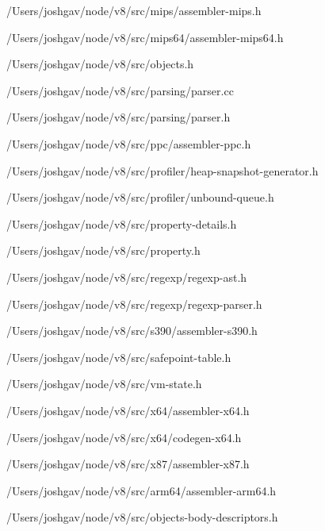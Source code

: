 \begin{DoxyCompactItemize}
/\+Users/joshgav/node/v8/src/mips/assembler-\/mips.\+h\item 
/\+Users/joshgav/node/v8/src/mips64/assembler-\/mips64.\+h\item 
/\+Users/joshgav/node/v8/src/objects.\+h\item 
/\+Users/joshgav/node/v8/src/parsing/parser.\+cc\item 
/\+Users/joshgav/node/v8/src/parsing/parser.\+h\item 
/\+Users/joshgav/node/v8/src/ppc/assembler-\/ppc.\+h\item 
/\+Users/joshgav/node/v8/src/profiler/heap-\/snapshot-\/generator.\+h\item 
/\+Users/joshgav/node/v8/src/profiler/unbound-\/queue.\+h\item 
/\+Users/joshgav/node/v8/src/property-\/details.\+h\item 
/\+Users/joshgav/node/v8/src/property.\+h\item 
/\+Users/joshgav/node/v8/src/regexp/regexp-\/ast.\+h\item 
/\+Users/joshgav/node/v8/src/regexp/regexp-\/parser.\+h\item 
/\+Users/joshgav/node/v8/src/s390/assembler-\/s390.\+h\item 
/\+Users/joshgav/node/v8/src/safepoint-\/table.\+h\item 
/\+Users/joshgav/node/v8/src/vm-\/state.\+h\item 
/\+Users/joshgav/node/v8/src/x64/assembler-\/x64.\+h\item 
/\+Users/joshgav/node/v8/src/x64/codegen-\/x64.\+h\item 
/\+Users/joshgav/node/v8/src/x87/assembler-\/x87.\+h\item 
/\+Users/joshgav/node/v8/src/arm64/assembler-\/arm64.\+h\item 
/\+Users/joshgav/node/v8/src/objects-\/body-\/descriptors.\+h\end{DoxyCompactItemize}
